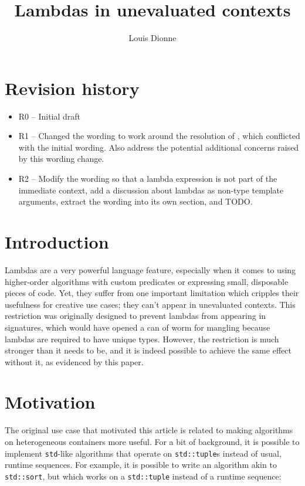 \documentclass{wg21}
\title{Lambdas in unevaluated contexts}
\author{Louis Dionne}
\newcommand{\cc}[1]{\texttt{#1}}
\begin{document}
\maketitle

\section{Revision history}
\begin{itemize}
  \item R0 -- Initial draft
  \item R1 -- Changed the wording to work around the resolution of \cite{DR1607},
              which conflicted with the initial wording. Also address the
              potential additional concerns raised by this wording change.
  \item R2 -- Modify the wording so that a lambda expression is not part of
              the immediate context, add a discussion about lambdas as
              non-type template arguments, extract the wording into its
              own section, and TODO.
\end{itemize}


\section{Introduction}
Lambdas are a very powerful language feature, especially when it comes to using
higher-order algorithms with custom predicates or expressing small, disposable
pieces of code. Yet, they suffer from one important limitation which cripples
their usefulness for creative use cases; they can't appear in unevaluated
contexts. This restriction was originally designed to prevent lambdas from
appearing in signatures, which would have opened a can of worm for mangling
because lambdas are required to have unique types. However, the restriction is
much stronger than it needs to be, and it is indeed possible to achieve the
same effect without it, as evidenced by this paper.


\section{Motivation}
The original use case that motivated this article is related to making algorithms
on heterogeneous containers more useful. For a bit of background, it is possible
to implement \cc{std}-like algorithms that operate on \cc{std::tuple}s instead of
usual, runtime sequences. For example, it is possible to write an algorithm akin
to \cc{std::sort}, but which works on a \cc{std::tuple} instead of a runtime
sequence:
\end{document}
